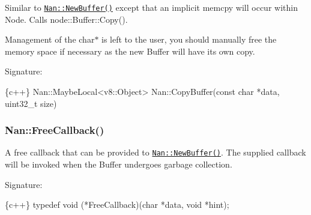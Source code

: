 Similar to \href{#api_nan_new_buffer}{\tt {\ttfamily Nan\+::\+New\+Buffer()}} except that an implicit memcpy will occur within Node. Calls {\ttfamily node\+::\+Buffer\+::\+Copy()}.

Management of the {\ttfamily char$\ast$} is left to the user, you should manually free the memory space if necessary as the new {\ttfamily Buffer} will have its own copy.

Signature\+:


\begin{DoxyCode}
\{c++\}
Nan::MaybeLocal<v8::Object> Nan::CopyBuffer(const char *data, uint32\_t size)
\end{DoxyCode}


\label{_api_nan_free_callback}%
 \subsubsection*{Nan\+::\+Free\+Callback()}

A free callback that can be provided to \href{#api_nan_new_buffer}{\tt {\ttfamily Nan\+::\+New\+Buffer()}}. The supplied callback will be invoked when the {\ttfamily Buffer} undergoes garbage collection.

Signature\+:


\begin{DoxyCode}
\{c++\}
typedef void (*FreeCallback)(char *data, void *hint);
\end{DoxyCode}
 